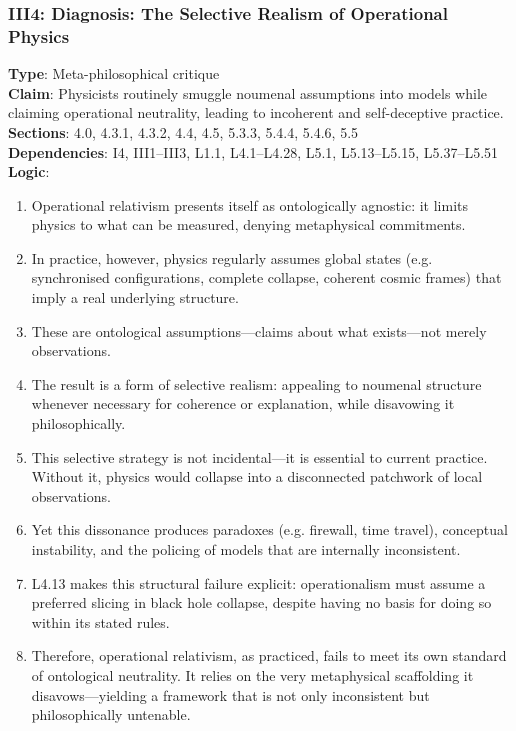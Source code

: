 \documentclass[12pt]{book}
\begin{document}
\subsubsection*{III4: Diagnosis: The Selective Realism of Operational Physics}
\label{appendix:III4}
\textbf{Type}: Meta-philosophical critique\\
\textbf{Claim}: Physicists routinely smuggle noumenal assumptions into models while claiming operational neutrality, leading to incoherent and self-deceptive practice.\\
\textbf{Sections}: 4.0, 4.3.1, 4.3.2, 4.4, 4.5, 5.3.3, 5.4.4, 5.4.6, 5.5\\
\textbf{Dependencies}: I4, III1–III3, L1.1, L4.1–L4.28, L5.1, L5.13–L5.15, L5.37–L5.51\\
\textbf{Logic}:
\begin{enumerate}
    \item Operational relativism presents itself as ontologically agnostic: it limits physics to what can be measured, denying metaphysical commitments.
    \item In practice, however, physics regularly assumes global states (e.g. synchronised configurations, complete collapse, coherent cosmic frames) that imply a real underlying structure.
    \item These are ontological assumptions---claims about what exists---not merely observations.
    \item The result is a form of selective realism: appealing to noumenal structure whenever necessary for coherence or explanation, while disavowing it philosophically.
    \item This selective strategy is not incidental---it is essential to current practice. Without it, physics would collapse into a disconnected patchwork of local observations.
    \item Yet this dissonance produces paradoxes (e.g. firewall, time travel), conceptual instability, and the policing of models that are internally inconsistent.
    \item L4.13 makes this structural failure explicit: operationalism must assume a preferred slicing in black hole collapse, despite having no basis for doing so within its stated rules.
    \item Therefore, operational relativism, as practiced, fails to meet its own standard of ontological neutrality. It relies on the very metaphysical scaffolding it disavows---yielding a framework that is not only inconsistent but philosophically untenable.
\end{enumerate}
\end{document}
